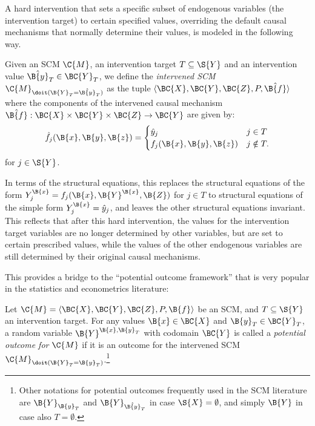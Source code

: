A hard intervention that sets a specific subset of endogenous variables (the intervention target)
to certain specified values, overriding
the default causal mechanisms that normally determine their values, is modeled in the following way.
\begin{Def}\label{def:intervened_scm_set}
  Given an SCM $\C{M}$, an intervention target $T \subseteq \S{Y}$ 
  and an intervention value $\hat{\B{y}}_T \in \BC{Y}_T$, we define the \emph{intervened SCM
  $\C{M}_{\doit(\B{Y}_T=\hat{\B{y}}_T)}$} as the tuple $\langle \BC{X},\BC{Y},\BC{Z},P,\hat{\B{f}} \rangle$ where
  the components of the intervened causal mechanism $\hat{\B{f}} : \BC{X} \times \BC{Y} \times \BC{Z} \to \BC{Y}$ are given by:
    $$\hat{f_j}(\B{x},\B{y},\B{z}) = \begin{cases}
        \hat{y}_j & j \in T \\
        f_j(\B{x},\B{y},\B{z}) & j \notin T.
    \end{cases}$$
  for $j \in \S{Y}$.
\end{Def}
In terms of the structural equations, this replaces the structural equations of the form
$Y_j^{\B{x}} = f_j(\B{x},\B{Y}^{\B{x}},\B{Z})$ for $j \in T$ to structural equations of the simple form $Y_j^{\B{x}} = \hat{y}_j$,
and leaves the other structural equations invariant.
This reflects that after this hard intervention, the values for
the intervention target variables are no longer determined by other variables, but are set to 
certain prescribed values, while the values of the other endogenous variables are still
determined by their original causal mechanisms.

This provides a bridge to the ``potential outcome framework'' that is very popular in the statistics and econometrics literature:
\begin{Def}\label{def:scm_potential_outcomes}
  Let $\C{M} = \langle \BC{X}, \BC{Y}, \BC{Z}, P, \B{f} \rangle$ be an SCM,
  and $T \subseteq \S{Y}$ an intervention target.
  For any values $\B{x} \in \BC{X}$ and $\B{y}_T \in \BC{Y}_T$, a random variable 
  $\B{Y}^{\B{x},\B{y}_T}$ with codomain $\BC{Y}$ is called a 
  \emph{potential outcome for $\C{M}$} if
  it is an outcome for the intervened SCM $\C{M}_{\doit(\B{Y}_T=\B{y}_T)}$.\footnote{Other notations for potential outcomes frequently used in the SCM literature are $\B{Y}_{\B{y}_T}$ and $\B{Y}_{\hat{\B{y}}_T}$ in case $\S{X} = \emptyset$, and simply $\B{Y}$ in case also $T = \emptyset$.}
\end{Def}

